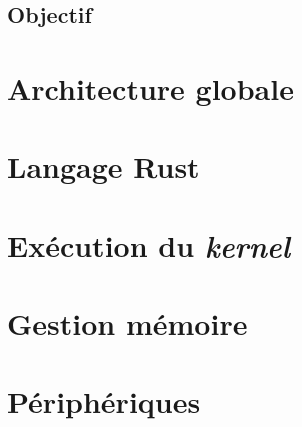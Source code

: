 \documentclass[a4paper, 12pt]{article}
\begin{document}

\subsection{Objectif}

\newpage

\section{Architecture globale}


\newpage

\section{Langage Rust}


\newpage

\section{Exécution du \textit{kernel}}


\newpage

\section{Gestion mémoire}


\newpage

\section{Périphériques}


\newpage
\end{document}
